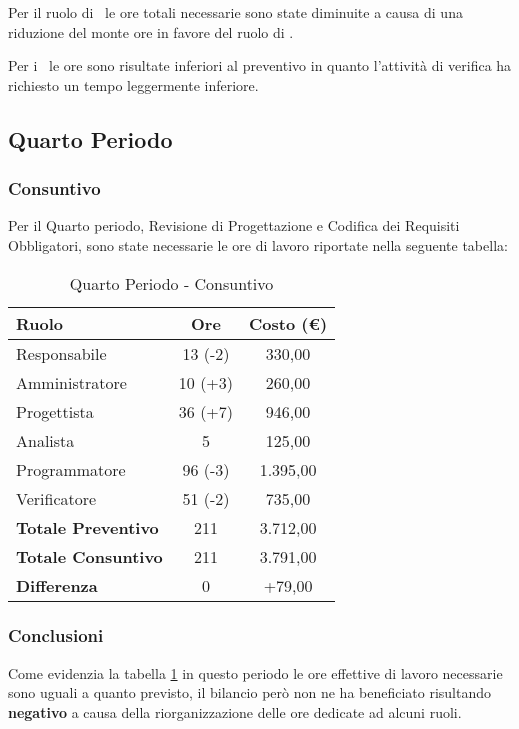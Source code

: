 \documentclass[../PianoDiProgetto_v3.0.0.tex]{subfiles}
\begin{document}
			Per il ruolo di \analista\ le ore totali necessarie sono state diminuite a causa di una riduzione del monte ore in favore del ruolo di \progettista.
			
			Per i \verificatori\ le ore sono risultate inferiori al preventivo in quanto l'attività di verifica ha richiesto un tempo leggermente inferiore. 

	\subsection{Quarto Periodo}
		\subsubsection{Consuntivo}
		Per il Quarto periodo, Revisione di Progettazione e Codifica dei Requisiti Obbligatori, sono state necessarie le ore di lavoro riportate nella seguente tabella:
		
		\begin{table}[h]
				\centering
				\begin{tabular}{l * {2}{c}}
					\toprule
					\textbf{Ruolo} & \textbf{Ore} & \textbf{Costo (\euro{})} \\
					\midrule
					Responsabile & 13 (-2) & 330,00 \\

					Amministratore & 10 (+3) & 260,00 \\

					Progettista & 36 (+7) & 946,00 \\

					Analista & 5 & 125,00 \\		

					Programmatore & 96 (-3) & 1.395,00 \\		

					Verificatore & 51 (-2) & 735,00 \\				
					\midrule		
					\textbf{Totale Preventivo} & 211 & 3.712,00 \\
					\textbf{Totale Consuntivo} & 211  & 3.791,00 \\
					\midrule
					\textbf{Differenza} & 0  & +79,00 \\
					\bottomrule
				\end{tabular}
				\caption{Quarto Periodo - Consuntivo}
				\label{tab:consuntivo4}	
			\end{table}
		
		\subsubsection{Conclusioni}
		Come evidenzia la tabella \ref{tab:consuntivo4} in questo periodo le ore effettive di lavoro necessarie sono uguali a quanto previsto, il bilancio però non ne ha beneficiato risultando \textbf{negativo} a causa della riorganizzazione delle ore dedicate ad alcuni ruoli.
		
\end{document}
